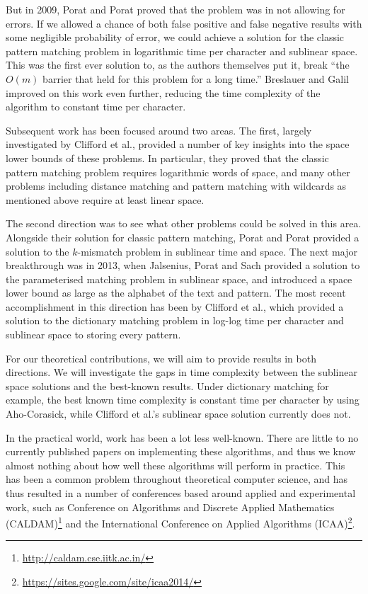 \documentclass[a4paper,11pt]{article}
\begin{document}
    But in 2009, Porat and Porat \cite{5438620} proved that the problem was in not allowing for errors. If we allowed a chance of both false positive and false negative results with some negligible probability of error, we could achieve a solution for the classic pattern matching problem in logarithmic time per character and sublinear space. This was the first ever solution to, as the authors themselves put it, break ``the $O(m)$ barrier that held for this problem for a long time.'' Breslauer and Galil \cite{Breslauer:2014:RSS:2660854.2635814} improved on this work even further, reducing the time complexity of the algorithm to constant time per character.

    Subsequent work has been focused around two areas. The first, largely investigated by Clifford et al.\@ \cite{DBLP:journals/corr/abs-1106-4412}, provided a number of key insights into the space lower bounds of these problems. In particular, they proved that the classic pattern matching problem requires logarithmic words of space, and many other problems including distance matching and pattern matching with wildcards as mentioned above require at least linear space.

    The second direction was to see what other problems could be solved in this area. Alongside their solution for classic pattern matching, Porat and Porat \cite{5438620} provided a solution to the $k$-mismatch problem in sublinear time and space. The next major breakthrough was in 2013, when Jalsenius, Porat and Sach \cite{JPS:2013} provided a solution to the parameterised matching problem in sublinear space, and introduced a space lower bound as large as the alphabet of the text and pattern. The most recent accomplishment in this direction has been by Clifford et al.\@ \cite{2015arXiv150406242C}, which provided a solution to the dictionary matching problem in log-log time per character and sublinear space to storing every pattern.

    For our theoretical contributions, we will aim to provide results in both directions. We will investigate the gaps in time complexity between the sublinear space solutions and the best-known results. Under dictionary matching for example, the best known time complexity is constant time per character by using Aho-Corasick, while Clifford et al.'s sublinear space solution currently does not.

    In the practical world, work has been a lot less well-known. There are little to no currently published papers on implementing these algorithms, and thus we know almost nothing about how well these algorithms will perform in practice. This has been a common problem throughout theoretical computer science, and has thus resulted in a number of conferences based around applied and experimental work, such as Conference on Algorithms and Discrete Applied Mathematics (CALDAM)\footnote{\url{http://caldam.cse.iitk.ac.in/}} and the International Conference on Applied Algorithms (ICAA)\footnote{\url{https://sites.google.com/site/icaa2014/}}.
\end{document}
